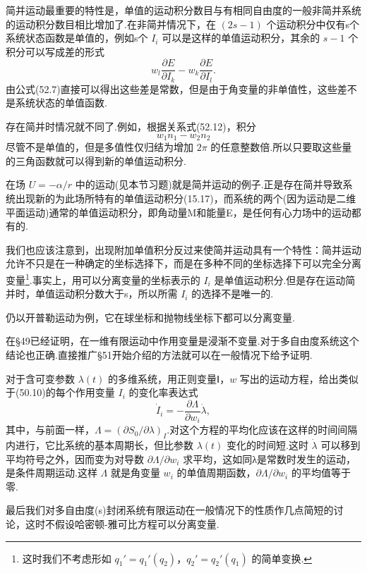 简并运动最重要的特性是，单值的运动积分数目与有相同自由度的一般非简并系统的运动积分数目相比增加了.在非简并情况下，在
$(2s-1)$
个运动积分中仅有s个系统状态函数是单值的，例如s个 $I_i$
可以是这样的单值运动积分，其余的 $s-1$ 个积分可以写成差的形式
\begin{equation}
  w_l\frac{\partial E}{\partial I_k}-w_k\frac{\partial E}{\partial I_l}.
\end{equation}
由公式(52.7)直接可以得出这些差是常数，但是由于角变量的非单值性，这些差不是系统状态的单值函数.

存在简并时情况就不同了.例如，根据关系式(52.12)，积分
\begin{equation}
  w_1n_1-w_2n_2
\end{equation}
尽管不是单值的，但是多值性仅归结为增加 $2\pi$
的任意整数倍.所以只要取这些量的三角函数就可以得到新的单值运动积分.

在场 $U=-\alpha/r$
中的运动(见本节习题)就是简并运动的例子.正是存在简并导致系统出现新的为此场所特有的单值运动积分(15.17)，而系统的两个(因为运动是二维平面运动)通常的单值运动积分，即角动量M和能量E，是任何有心力场中的运动都有的.

我们也应该注意到，出现附加单值积分反过来使简并运动具有一个特性：简并运动允许不只是在一种确定的坐标选择下，而是在多种不同的坐标选择下可以完全分离变量\footnote{这时我们不考虑形如 $q_1'=q_1'(q_2)$，$q_2'=q_2'(q_1)$ 的简单变换.}.事实上，用可以分离变量的坐标表示的
$I_i$
是单值运动积分.但是存在运动简并时，单值运动积分数大于s，所以所需 $I_i$
的选择不是唯一的.

仍以开普勒运动为例，它在球坐标和抛物线坐标下都可以分离变量.

在§49已经证明，在一维有限运动中作用变量是浸渐不变量.对于多自由度系统这个结论也正确.直接推广§51开始介绍的方法就可以在一般情况下给予证明.

对于含可变参数 $\lambda(t)$
的多维系统，用正则变量Ⅰ，$w$
写出的运动方程，给出类似于(50.10)的每个作用变量 $I_i$
的变化率表达式
\begin{equation}
  \dot{I}_i=-\frac{\partial\Lambda}{\partial w_i}\dot{\lambda},
\end{equation}
其中，与前面一样，$\Lambda=(\partial S_0/\partial\lambda)_I$.对这个方程的平均化应该在这样的时间间隔内进行，它比系统的基本周期长，但比参数
$\lambda(t)$ 变化的时间短.这时 $\dot{\lambda}$
可以移到平均符号之外，因而变为对导数 $\partial\Lambda/\partial w_i$
求平均，这如同λ是常数时发生的运动，是条件周期运动.这样 $\Lambda$
就是角变量 $w_i$ 的单值周期函数，$\partial\Lambda/\partial w_i$
的平均值等于零.

最后我们对多自由度(s)封闭系统有限运动在一般情况下的性质作几点简短的讨论，这时不假设哈密顿-雅可比方程可以分离变量.

